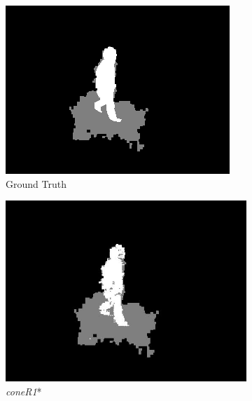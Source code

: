 \documentclass[12pt]{report}
\begin{document}
\begin{figure}
  \begin{subfigure}{.24\linewidth}
  \includegraphics[width=1\linewidth]{figures/model/room_0275_gt.jpg}
  \caption{Ground Truth}
  \end{subfigure}
  \hfill
  \begin{subfigure}{.24\linewidth}
  \includegraphics[width=1\linewidth]{figures/model/room_0275_optimal.jpg}
  \caption{\textit{coneR1}*}
  \end{subfigure}
  \hfill
  \begin{subfigure}{.24\linewidth}

\end{subfigure}
\end{figure}
\end{document}
